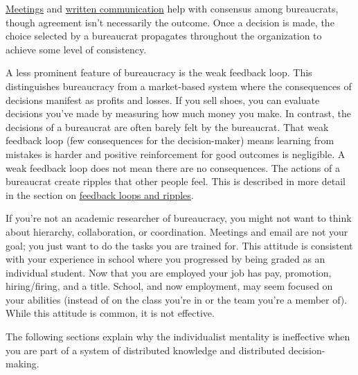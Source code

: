 \hyperref[sec:meetings-for-coordination]{Meetings} and 
%
\hyperref[sec:written-communication]{written communication} help with consensus among bureaucrats, though agreement isn't necessarily the outcome.
Once a decision is made, the choice selected by a bureaucrat propagates throughout the organization to achieve some level of consistency. 

A less prominent feature of bureaucracy is the weak 
\gls{feedback loop}. 
 \iftoggle{glossaryinmargin}{\marginpar{[Glossary]}}{}%
 This distinguishes bureaucracy from a market-based system where the consequences of decisions manifest as profits and losses. If you sell shoes, you can evaluate decisions you've made by measuring how much money you make. In contrast, the decisions of a bureaucrat are often barely felt by the bureaucrat. That weak feedback loop (few consequences for the decision-maker) means learning from mistakes is harder and positive reinforcement for good outcomes is negligible. A weak feedback loop does not mean there are no consequences. The actions of a bureaucrat create ripples that other people feel. This is described in more detail in the section on \hyperref[sec:feedback-loop-and-ripples]{feedback loops and ripples}.


If you're not an academic researcher of bureaucracy, you might not want to think about hierarchy, collaboration, or coordination. 
Meetings and email are not your goal; you just want to do the tasks you are trained for. This attitude is consistent with your experience in school where you progressed by being graded as an individual student. Now that you are employed your job has pay, promotion, hiring/firing, and a title. School, and now employment, may seem focused on your abilities (instead of on the class you're in or the team you're a member of). While this attitude is common, it is not effective.

The following sections explain why the individualist mentality is ineffective when you are part of a system of distributed knowledge and distributed decision-making. 


